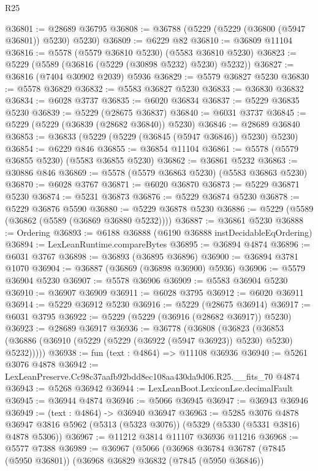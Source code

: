 \begin{lexlean}{R25}
\begin{coremodule}
@36801 := @28689 @36795
@36808 := @36788 (@5229 (@5229 (@36800 (@5947 @36801)) @5230) @5230)
@36809 := @6229 @82
@36810 := @36809 @11104
@36816 := @5578 (@5579 @36810 @5230) (@5583 @36810 @5230)
@36823 := @5229 (@5589 (@36816 (@5229 (@30898 @5232) @5230) @5232))
@36827 := @36816 (@7404 @30902 @2039) @5936
@36829 := @5579 @36827 @5230
@36830 := @5578 @36829
@36832 := @5583 @36827 @5230
@36833 := @36830 @36832
@36834 := @6028 @3737
@36835 := @6020 @36834
@36837 := @5229 @36835 @5230
@36839 := @5229 (@28675 @36837)
@36840 := @6031 @3737
@36845 := @5229 (@5229 (@36839 (@28682 @36840)) @5230)
@36846 := @28689 @36840
@36853 := @36833 (@5229 (@5229 (@36845 (@5947 @36846)) @5230) @5230)
@36854 := @6229 @846
@36855 := @36854 @11104
@36861 := @5578 (@5579 @36855 @5230) (@5583 @36855 @5230)
@36862 := @36861 @5232
@36863 := @30886 @846
@36869 := @5578 (@5579 @36863 @5230) (@5583 @36863 @5230)
@36870 := @6028 @3767
@36871 := @6020 @36870
@36873 := @5229 @36871 @5230
@36874 := @5231 @36873
@36876 := @5229 @36874 @5230
@36878 := @5229 @36876 @5590
@36880 := @5229 @36878 @5230
@36886 := @5229 (@5589 (@36862 (@5589 (@36869 @36880 @5232))))
@36887 := @36861 @5230
@36888 := Ordering
@36893 := @6188 @36888 (@6190 @36888 instDecidableEqOrdering)
@36894 := LexLeanRuntime.compareBytes
@36895 := @36894 @4874
@36896 := @6031 @3767
@36898 := @36893 (@36895 @36896)
@36900 := @36894 @3781 @1070
@36904 := @36887 (@36869 (@36898 @36900) @5936)
@36906 := @5579 @36904 @5230
@36907 := @5578 @36906
@36909 := @5583 @36904 @5230
@36910 := @36907 @36909
@36911 := @6028 @3795
@36912 := @6020 @36911
@36914 := @5229 @36912 @5230
@36916 := @5229 (@28675 @36914)
@36917 := @6031 @3795
@36922 := @5229 (@5229 (@36916 (@28682 @36917)) @5230)
@36923 := @28689 @36917
@36936 := @36778
    (@36808
      (@36823 (@36853 (@36886 (@36910 (@5229 (@5229 (@36922 (@5947 @36923)) @5230) @5230) @5232)))))
@36938 := fun (text : @4864) => @11108 @36936
@36940 := @5261 @3076 @4878
@36942 := LexLeanPreserve.Cc98c37aafb92bdd8ec108aa430da9d06.R25.__fits_70 @4874
@36943 := @5268 @36942
@36944 := LexLeanBoot.LexiconLse.decimalFault
@36945 := @36944 @4874
@36946 := @5066 @36945
@36947 := @36943 @36946
@36949 := (text : @4864) -> @36940 @36947
@36963 := @5285
    @3076
    @4878
    @36947
    @3816
    @5962
    (@5313 (@5323 @3076))
    (@5329 (@5330 (@5331 @3816) @4878 @5306))
@36967 := @11212 @3814 @11107 @36936 @11216
@36968 := @5577 @7388
@36989 := @36967
    (@5066
      (@36968
        @36784
        @36787
        (@7845 (@5950 @36801))
        (@36968
          @36829
          @36832
          (@7845 (@5950 @36846))

\end{coremodule}
\end{lexlean}
